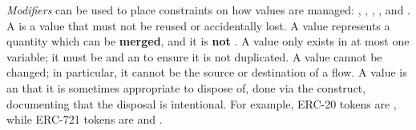 \documentclass[nonacm, dvipsnames, usenames, sigconf]{acmart}
\begin{document}
\emph{Modifiers} can be used to place constraints on how values are managed: , , , , and .
A  is a value that must not be reused or accidentally lost.
A  value represents a quantity which can be \textbf{merged}, and it is \textbf{not} .
A  value only exists in at most one variable; it must be  and an  to ensure it is not duplicated.
A  value cannot be changed; in particular, it cannot be the source or destination of a flow.
A  value is an  that it is sometimes appropriate to dispose of, done via the  construct, documenting that the disposal is intentional.
For example, ERC-20 tokens are , while ERC-721 tokens are  and .
%
\end{document}
